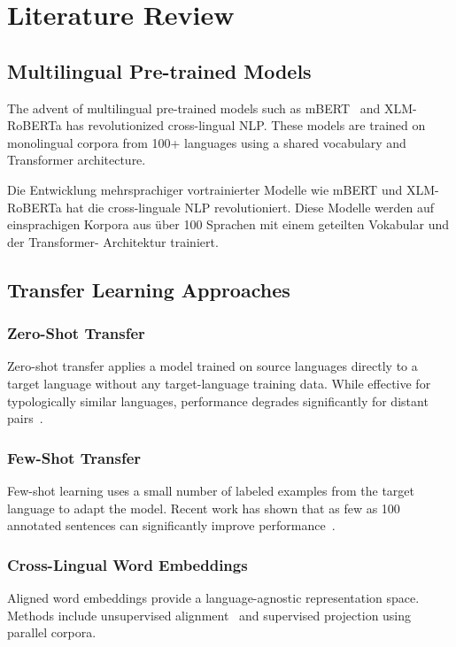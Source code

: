 \chapter{Literature Review}
\label{chap:lit-review}

\section{Multilingual Pre-trained Models}

The advent of multilingual pre-trained models such as
mBERT~\cite{goossensLaTeXCompanion1993} and XLM-RoBERTa has
revolutionized cross-lingual NLP.  These models are trained on
monolingual corpora from 100+ languages using a shared vocabulary
and Transformer architecture.

\foreignlanguage{german}{Die Entwicklung mehrsprachiger vortrainierter
Modelle wie mBERT und XLM-RoBERTa hat die cross-linguale NLP
revolutioniert.  Diese Modelle werden auf einsprachigen Korpora aus
über 100 Sprachen mit einem geteilten Vokabular und der Transformer-
Architektur trainiert.}

\section{Transfer Learning Approaches}

\subsection{Zero-Shot Transfer}
Zero-shot transfer applies a model trained on source languages directly
to a target language without any target-language training data.  While
effective for typologically similar languages, performance degrades
significantly for distant pairs~\cite{einstein1905}.

\subsection{Few-Shot Transfer}
Few-shot learning uses a small number of labeled examples from the
target language to adapt the model.  Recent work has shown that as
few as 100 annotated sentences can significantly improve
performance~\cite{bibid}.

\subsection{Cross-Lingual Word Embeddings}
Aligned word embeddings provide a language-agnostic representation
space.  Methods include unsupervised alignment~\cite{einstein1905}
and supervised projection using parallel corpora.

